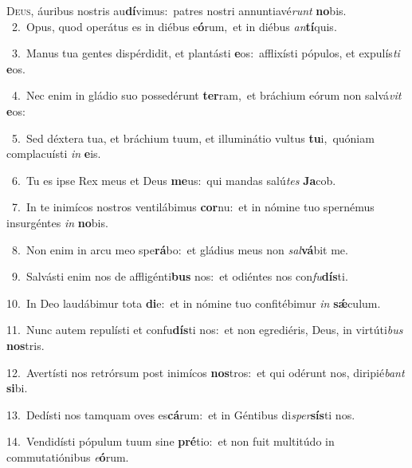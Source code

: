 \lettrine{\initial\textcolor{\initialcolor}{D}}{eus,} áuribus nostris au\-\textbf{dí}\-vimus:~\star patres nostri annuntiavé\textit{runt} \textbf{no}\-bis.\\
{\numbfont\textcolor{\numbcolor}{~2.}}~Opus, quod operátus es in diébus e\-\textbf{ó}\-rum,~\star et in diébus \textit{an}\-\textbf{tí}quis.\par
{\numbfont\textcolor{\numbcolor}{~3.}}~Manus tua gentes dispérdidit, et plantásti \textbf{e}\-os:~\star afflixísti pópulos, et expulís\textit{ti} \textbf{e}\-os.\par
{\numbfont\textcolor{\numbcolor}{~4.}}~Nec enim in gládio suo possedérunt \textbf{ter}\-ram,~\star et bráchium eórum non salvá\textit{vit} \textbf{e}\-os:\par
{\numbfont\textcolor{\numbcolor}{~5.}}~Sed déxtera tua, et bráchium tuum, et illuminátio vultus \textbf{tu}\-i,~\star quóniam complacuísti \textit{in} \textbf{e}\-is.\par
{\numbfont\textcolor{\numbcolor}{~6.}}~Tu es ipse Rex meus et Deus \textbf{me}\-us:~\star qui mandas salú\textit{tes} \textbf{Ja}\-cob.\par
{\numbfont\textcolor{\numbcolor}{~7.}}~In te inimícos nostros ventilábimus \textbf{cor}\-nu:~\star et in nómine tuo spernémus insurgéntes \textit{in} \textbf{no}\-bis.\par
{\numbfont\textcolor{\numbcolor}{~8.}}~Non enim in arcu meo spe\-\textbf{rá}\-bo:~\star et gládius meus non \textit{sal}\-\textbf{vá}bit me.\par
{\numbfont\textcolor{\numbcolor}{~9.}}~Salvásti enim nos de affligénti\textbf{bus} nos:~\star et odiéntes nos con\-\textit{fu}\-\textbf{dís}ti.\par
{\numbfont\textcolor{\numbcolor}{10.}}~In Deo laudábimur tota \textbf{di}\-e:~\star et in nómine tuo confitébimur \textit{in} \textbf{sǽ}\-culum.\par
{\numbfont\textcolor{\numbcolor}{11.}}~Nunc autem repulísti et confu\-\textbf{dís}\-ti nos:~\star et non egrediéris, Deus, in virtúti\textit{bus} \textbf{nos}\-tris.\par
{\numbfont\textcolor{\numbcolor}{12.}}~Avertísti nos retrórsum post inimícos \textbf{nos}\-tros:~\star et qui odérunt nos, diripié\textit{bant} \textbf{si}\-bi.\par
{\numbfont\textcolor{\numbcolor}{13.}}~Dedísti nos tamquam oves es\-\textbf{cá}\-rum:~\star et in Géntibus di\-\textit{sper}\-\textbf{sís}ti nos.\par
{\numbfont\textcolor{\numbcolor}{14.}}~Vendidísti pópulum tuum sine \textbf{pré}\-tio:~\star et non fuit multitúdo in commutatiónibus \textit{e}\-\textbf{ó}rum.\par
